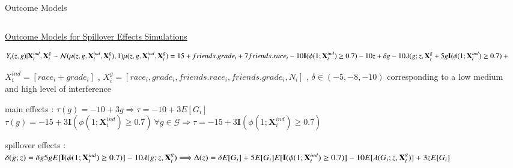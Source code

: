 \documentclass[notes,11pt, aspectratio=169]{beamer}
\begin{document}
\begin{frame}{Outcome Models }
\begin{columns}[T] %
\begin{column}{1\textwidth}
\begin{wideitemize}
    \item \underline{Outcome Models for Spillover Effects Simulations}
    \begin{center}
    \begin{equation*}
        Y_i(z,g)|\mathbf{X}_{i}^{ind} , \mathbf{X}_{i}^{g}  \sim \mathcal{N}(\mu(z,g,\mathbf{X}_{i}^{ind},\mathbf{X}_{i}^{g}),1) \\
        \mu(z,g,\mathbf{X}_{i}^{ind},\mathbf{X}_{i}^{g} )  =15+friends.grade_i+7friends.race_i-10\mathbf{I}(\phi(1;\mathbf{X}_{i}^{ind}) \geq 0.7)-10z  +\delta g - 10 \lambda(g;z,\mathbf{X}_{i}^{g} + 5g\mathbf{I}(\phi(1;\mathbf{X}_{i}^{ind}) \geq 0.7) +3zg
    \end{equation*} 
    \end{center}
    \item $X_i^{ind}=[race_i+grade_i]$ , $X_i^{g}=[race_i , grade_i , friends.race_i ,  friends.grade_i , N_i]$ , $\delta \in (-5,-8,-10)$ corresponding to a low medium and high level of interference
    \item main effects : $\tau(g)=-10+3g \Longrightarrow \tau=-10+3E[G_i]$
    $\tau(g)=-15+3\mathbf{I}(\phi(1;\mathbf{X}_{i}^{ind}) \geq 0.7) \  \forall g \in \mathcal{G}  \Longrightarrow \tau=-15+3\mathbf{I}(\phi(1;\mathbf{X}_{i}^{ind}) \geq 0.7) $
    \item spillover effects : $\delta(g;z)=\delta g 5 g E[\mathbf{I}(\phi(1;\mathbf{X}_{i}^{ind}) \geq 0.7)] - 10 \lambda (g;z,\mathbf{X}_{i}^{g}) \\ \Longrightarrow  \Delta(z)=\delta E[G_i] + 5E[G_i]E[\mathbf{I}(\phi(1;\mathbf{X}_{i}^{ind}) \geq 0.7)] - 10E[\lambda (G_i;z,\mathbf{X}_{i}^{g})] + 3z E[G_i] $
\end{wideitemize}
\end{column}%
\hfill%
\begin{column}{.38\textwidth}
  \vspace{20pt}
  \vspace{20pt}
\end{column}%
\end{columns}
\end{frame}
\end{document}
